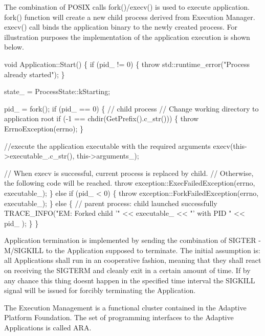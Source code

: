 \begin{DoxyEnumerate}
\item The combination of P\+O\+S\+IX calls fork()/execv() is used to execute application. fork() function will create a new child process derived from Execution Manager. execv() call binds the application binary to the newly created process. For illustration purposes the implementation of the application execution is shown below. 
\begin{DoxyCode}
\textcolor{keywordtype}{void} Application::Start() \{
    \textcolor{keywordflow}{if} (pid\_ != 0) \{
        \textcolor{keywordflow}{throw} std::runtime\_error(\textcolor{stringliteral}{"Process already started"});
    \}

    state\_ = ProcessState::kStarting;

    pid\_ = fork();
    \textcolor{keywordflow}{if} (pid\_ == 0) \{
        \textcolor{comment}{// child process}
        \textcolor{comment}{// Change working directory to application root}
        \textcolor{keywordflow}{if} (-1 == chdir(GetPrefix().c\_str())) \{
            \textcolor{keywordflow}{throw} ErrnoException(errno);
    \}

        \textcolor{comment}{//execute the application executable with the required arguments}
        execv(this->executable\_.c\_str(), this->arguments\_);

        \textcolor{comment}{// When execv is successful, current process is replaced by child.}
        \textcolor{comment}{// Otherwise, the following code will be reached.}
        \textcolor{keywordflow}{throw} exception::ExecFailedException(errno, executable\_);
    \} \textcolor{keywordflow}{else} \textcolor{keywordflow}{if} (pid\_ < 0) \{
        \textcolor{keywordflow}{throw} exception::ForkFailedException(errno, executable\_);
    \} \textcolor{keywordflow}{else} \{
        \textcolor{comment}{// parent process: child launched successfully}
        TRACE\_INFO(\textcolor{stringliteral}{"EM: Forked child ’"} << executable\_ << \textcolor{stringliteral}{"’ with PID "} << pid\_ );
    \}
\}
\end{DoxyCode}

\item Application termination is implemented by sending the combination of S\+I\+G\+T\+ER -\/ M/\+S\+I\+G\+K\+I\+LL to the Application supposed to terminate. The initial assumption is\+: all Applications shall run in an cooperative fashion, meaning that they shall react on receiving the S\+I\+G\+T\+E\+RM and cleanly exit in a certain amount of time. If by any chance this thing doesn\textquotesingle{}t happen in the specified time interval the S\+I\+G\+K\+I\+LL signal will be issued for forcibly terminating the Application.

The Execution Management is a functional cluster contained in the Adaptive Platform Foundation. The set of programming interfaces to the Adaptive Applications is called A\+RA.
\end{DoxyEnumerate}

